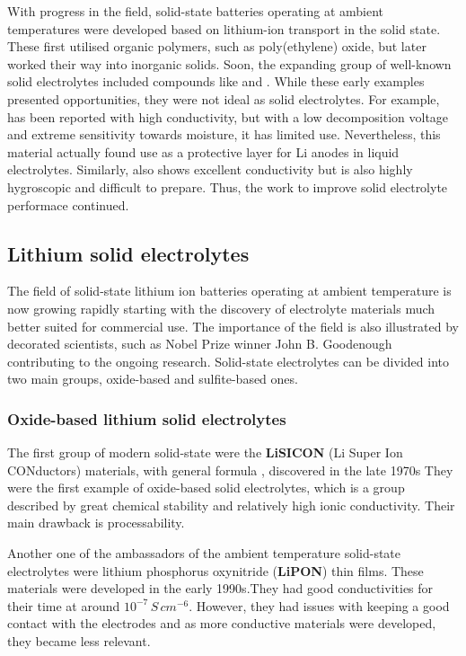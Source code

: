 \documentclass[10pt,a4paper, titlepage]{article}
\begin{document}
With progress in the field, solid-state batteries operating at ambient temperatures were developed based on lithium-ion transport in the solid state. 
These first utilised organic polymers, such as poly(ethylene) oxide\cite{RN14}, but later worked their way into inorganic solids. 
Soon, the expanding group of well-known solid electrolytes included compounds like  and . 
While these early examples presented opportunities, they were not ideal as solid electrolytes. 
For example,  has been reported with high conductivity, but with a low decomposition voltage and extreme sensitivity towards moisture, it has limited use. \cite{RN3} 
Nevertheless, this material actually found use as a protective layer for Li anodes in liquid electrolytes. \cite{RN16}
Similarly,  also shows excellent conductivity but is also highly hygroscopic and difficult to prepare. \cite{RN17} Thus, the work to improve solid electrolyte performace continued.

\subsection{Lithium solid electrolytes}

The field of solid-state lithium ion batteries operating at ambient temperature is now growing rapidly starting with the discovery of electrolyte materials much better suited for commercial use. 
The importance of the field is also illustrated by decorated scientists, such as Nobel Prize winner John B. Goodenough contributing to the ongoing research. \cite{RN40}
Solid-state electrolytes can be divided into two main groups, oxide-based and sulfite-based ones. 

\subsubsection{Oxide-based lithium solid electrolytes}

The first group of modern solid-state were the \textbf{LiSICON} (Li Super Ion CONductors) materials, with general formula , discovered in the late 1970s
They were the first example of oxide-based solid electrolytes, which is a group described by great chemical stability and relatively high ionic conductivity.
Their main drawback is processability.

Another one of the ambassadors of the ambient temperature solid-state electrolytes were lithium phosphorus oxynitride (\textbf{LiPON}) thin films. 
These materials were developed in the early 1990s.They had good conductivities for their time at around $10^{-7} \, S \, cm^{-6}$. 
However, they had issues with keeping a good contact with the electrodes and as more conductive materials were developed, they became less relevant. \cite{RN15} 
\end{document}
